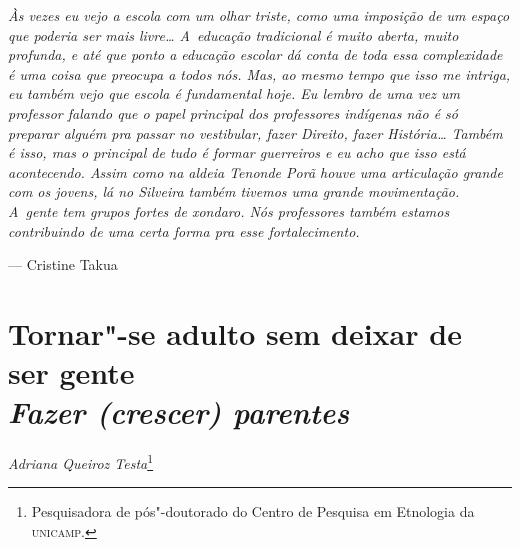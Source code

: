 \clearpage

\vspace*{\fill}

\begin{flushright}
\begin{minipage}[c]{0.85\textwidth}
\raggedleft
\footnotesize
\emph{Às vezes eu vejo a escola com um olhar triste, como uma imposição de um
espaço que poderia ser mais livre\ldots{} A~educação tradicional é muito
aberta, muito profunda, e até que ponto a educação escolar dá conta de
toda essa complexidade é uma coisa que preocupa a todos nós. Mas, ao
mesmo tempo que isso me intriga, eu também vejo que escola é
fundamental hoje. Eu lembro de uma vez um professor falando que o papel
principal dos professores indígenas não é só preparar alguém pra passar
no vestibular, fazer Direito, fazer História\ldots{} Também é isso, mas o
principal de tudo é formar guerreiros e eu acho que isso está
acontecendo. Assim como na aldeia Tenonde Porã houve uma articulação
grande com os jovens, lá no Silveira também tivemos uma grande
movimentação. A~gente tem grupos fortes de \emph{xondaro}. Nós professores
também estamos contribuindo de uma certa forma pra esse fortalecimento.}

\smallskip
\hspace*{\fill}--- Cristine Takua
\end{minipage}
\end{flushright}

\thispagestyle{empty}

\chapter*{Tornar"-se adulto sem deixar de ser gente\\
\large{\emph{Fazer (crescer) parentes}}}


\begin{flushright}
\emph{Adriana Queiroz Testa}\footnote{Pesquisadora de pós"-doutorado do Centro
de Pesquisa em Etnologia da \textsc{unicamp}.}
\end{flushright}

